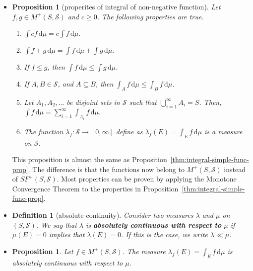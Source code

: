 \documentclass[10pt]{article}
\newtheorem{definition}[lemma]{Definition}
\newtheorem{proposition}[lemma]{Proposition}
\numberwithin{lemma}{section}
\newcommand{\dee}{\mathrm{d}}
\newcommand{\mcal}[1]{\mathcal{#1}}
\begin{document}
\begin{itemize}
  \item \begin{proposition}[properites of integral of non-negative function] \label{thm:non-negative-integral-prop}
    Let $f,g \in M^+(S, \mcal{S})$ and $c \geq 0$. The following properties are true.
    \begin{enumerate}
      \item $\int cf\, \dee\mu = c \int f\, \dee\mu.$
      
      \item $\int f+g\, \dee\mu = \int f\, \dee\mu + \int g\, \dee\mu.$

      \item If $f \leq g$, then $\int f\, \dee\mu \leq \int g\, \dee\mu$.
      
      \item If $A,B \in \mcal{S}$, and $A \subseteq B$, then $\int_A f\,\dee\mu \leq \int_B f\,\dee\mu$.
      
      \item Let $A_1, A_2, \dotsc$ be disjoint sets in $\mcal{S}$ such that $\bigcup_{i=1}^\infty A_i = S$. Then, $\int f\, \dee\mu = \sum_{i=1}^\infty \int_{A_i} f\, \dee\mu.$
      
      \item The function $\lambda_f: \mcal{S} \rightarrow [0,\infty]$ define as $\lambda_f(E) = \int_E f\, \dee\mu$ is a measure on $\mcal{S}$.
    \end{enumerate}
  \end{proposition}
  This proposition is almost the same as Proposition~\ref{thm:integral-simple-func-prop}. The difference is that the functions now belong to $M^+(S,\mcal{S})$ instead of $SF^+(S,\mcal{S})$. Most properties can be proven by applying the Monotone Convergence Theorem to the properties in Proposition~\ref{thm:integral-simple-func-prop}.

  \item \begin{definition}[absolute continuity]
    Consider two measures $\lambda$ and $\mu$ on $(S,\mcal{S})$. We say that $\lambda$ is {\bf absolutely continuous with respect to} $\mu$ if $\mu(E) = 0$ implies that $\lambda(E) = 0$. If this is the case, we write $\lambda \ll \mu$.
  \end{definition}

  \item \begin{proposition} 
    Let $f \in M^+(S,\mcal{S})$. The measure $\lambda_f(E) = \int_E f\,\dee\mu$ is absolutely continuous with respect to $\mu$.  
  \end{proposition}


\end{itemize}
\end{document}
